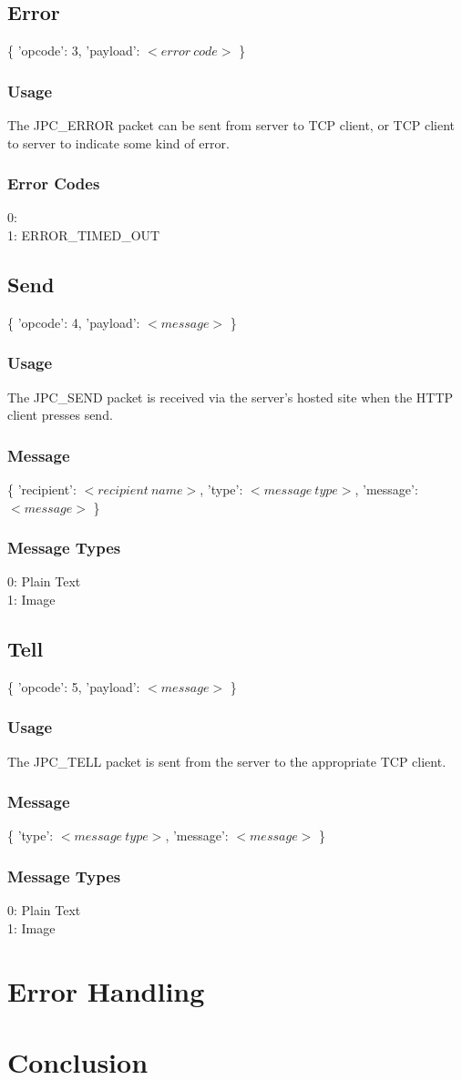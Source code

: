 \documentclass[a4paper, 10pt]{article}
\begin{document}
	\subsection{Error}
	\{ 'opcode': 3, 'payload': $<error\ code>$ \}
	
		\subsubsection{Usage}
		The JPC\_ERROR packet can be sent from server to TCP client, or TCP client to server to indicate some kind of error.
		\subsubsection{Error Codes}
		0:\\
		1: ERROR\_TIMED\_OUT\\
		
	\subsection{Send}
	\{ 'opcode': 4, 'payload': $<message>$ \}
		\subsubsection{Usage}
		The JPC\_SEND packet is received via the server's hosted site when the HTTP client presses send.
		\subsubsection{Message}
		\{ 'recipient': $<recipient\ name>$, 'type': $<message\ type>$, 'message': $<message>$ \}
		\subsubsection{Message Types}
		0: Plain Text\\
		1: Image\\
		
	\subsection{Tell}
	\{ 'opcode': 5, 'payload': $<message>$ \}
		\subsubsection{Usage}
		The JPC\_TELL packet is sent from the server to the appropriate TCP client.
		\subsubsection{Message}
		\{ 'type': $<message\ type>$, 'message': $<message>$ \}
		\subsubsection{Message Types}
		0: Plain Text\\
		1: Image\\

\section{Error Handling}

\section{Conclusion}
\end{document}
